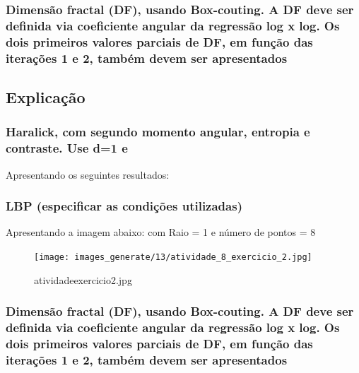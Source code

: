 \documentclass[10pt,a4paper]{article}
\begin{document}


\subsubsection{Dimensão fractal (DF), usando Box-couting. A DF deve ser definida via coeficiente angular da regressão log x log. Os dois primeiros valores parciais de DF, em função das iterações 1 e 2, também devem ser apresentados}



\subsection{Explicação}

\subsubsection{Haralick, com segundo momento angular, entropia e contraste. Use d=1 e  }

\begin{flushleft}
Apresentando os seguintes resultados:
\end{flushleft}



\subsubsection{LBP (especificar as condições utilizadas)}

\begin{flushleft}
Apresentando a imagem abaixo: com Raio = 1 e número de pontos = 8 
\end{flushleft}

\begin{figure}[H]
    \centering
    {{\texttt{[image: images\_generate/13/atividade\_8\_exercicio\_2.jpg]}}}
    \caption{atividade\textunderscore exercicio\textunderscore 2.jpg}
\end{figure}

\subsubsection{Dimensão fractal (DF), usando Box-couting. A DF deve ser definida via coeficiente angular da regressão log x log. Os dois primeiros valores parciais de DF, em função das iterações 1 e 2, também devem ser apresentados}
\end{document}

